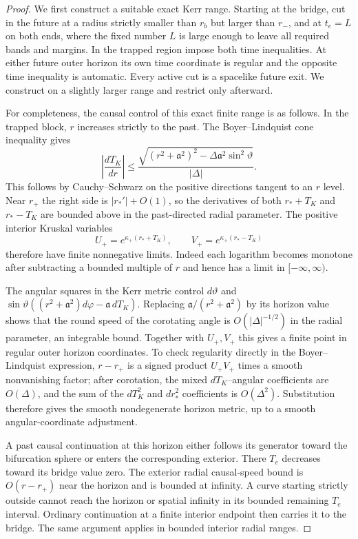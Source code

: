 \begin{proof}
We first construct a suitable exact Kerr range. Starting at the bridge,
cut in the future at a radius strictly smaller than $r_b$ but larger
than $r_-$, and at $t_e=L$ on both ends, where the fixed number $L$ is
large enough to leave all required bands and margins. In the trapped
region impose both time inequalities. At either future outer horizon
its own time coordinate is regular and the opposite time inequality is
automatic. Every active cut is a spacelike future exit. We construct on
a slightly larger range and restrict only afterward.

For completeness, the causal control of this exact finite range is as
follows. In the trapped block, $r$ increases strictly to the past. The
Boyer--Lindquist cone inequality gives
\begin{equation}\label{cmp:bl-cone}
 \left|\frac{dT_K}{dr}\right|
 \leq
 \frac{\sqrt{(r^2+\mathfrak a^2)^2
                     -\Delta\mathfrak a^2\sin^2\vartheta}}
      {|\Delta|}.
\end{equation}
This follows by Cauchy--Schwarz on the positive directions tangent to
an $r$ level. Near $r_+$ the right side is $|r_*'|+O(1)$, so the
derivatives of both $r_*+T_K$ and $r_*-T_K$ are bounded above in the
past-directed radial parameter. The positive interior Kruskal variables
\[
 U_+=e^{\kappa_+(r_*+T_K)},\qquad
 V_+=e^{\kappa_+(r_*-T_K)}
\]
therefore have finite nonnegative limits. Indeed each logarithm becomes
monotone after subtracting a bounded multiple of $r$ and hence has a
limit in $[-\infty,\infty)$.

The angular squares in the Kerr metric control
$d\vartheta$ and
$\sin\vartheta((r^2+\mathfrak a^2)d\varphi-\mathfrak a\,dT_K)$.
Replacing $\mathfrak a/(r^2+\mathfrak a^2)$ by its horizon value shows
that the round speed of the corotating angle is
$O(|\Delta|^{-1/2})$ in the radial parameter, an integrable bound.
Together with $U_+,V_+$ this gives a finite point in regular outer
horizon coordinates. To check regularity directly in the
Boyer--Lindquist expression, $r-r_+$ is a signed product $U_+V_+$
times a smooth nonvanishing factor; after corotation, the mixed
$dT_K$--angular coefficients are $O(\Delta)$, and the sum of the
$dT_K^2$ and $dr_*^2$ coefficients is $O(\Delta^2)$. Substitution
therefore gives the smooth nondegenerate horizon metric, up to a smooth
angular-coordinate adjustment.

A past causal continuation at this horizon either follows its generator
toward the bifurcation sphere or enters the corresponding exterior.
There $T_e$ decreases toward its bridge value zero. The exterior radial
causal-speed bound is $O(r-r_+)$ near the horizon and is bounded at
infinity. A curve starting strictly outside cannot reach the horizon or
spatial infinity in its bounded remaining $T_e$ interval. Ordinary
continuation at a finite interior endpoint then carries it to the
bridge. The same argument applies in bounded interior radial ranges.


\end{proof}
